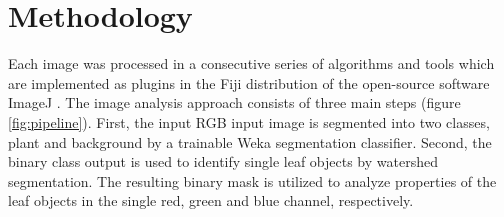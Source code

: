 \documentclass[paper=A4,bibliography=totocnumbered]{scrartcl}
\begin{document}
\section{Methodology}
Each image was processed in a consecutive series of algorithms and tools which are implemented as plugins in the Fiji distribution \citep{Schindelin.2012} of the open-source software ImageJ \citep{Rueden.2017}. The image analysis approach consists of three main steps (figure \ref{fig:pipeline}). First, the input RGB input image is segmented into two classes, plant and background by a trainable Weka segmentation classifier. Second, the binary class output is used to identify single leaf objects by watershed segmentation. The resulting binary mask is utilized to analyze properties of the leaf objects in the single red, green and blue channel, respectively.
\end{document}
